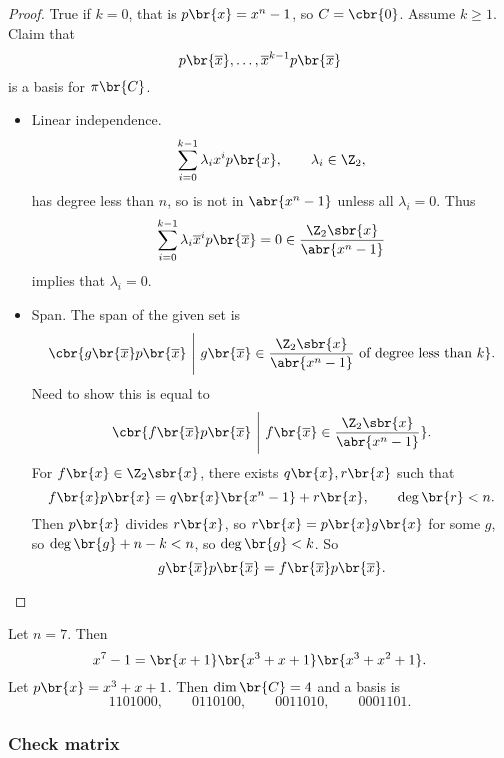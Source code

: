 \begin{proof}
True if $ k = 0 $, that is $ p\br{x} = x^n - 1 $, so $ C = \cbr{0} $. Assume $ k \ge 1 $. Claim that
$$ p\br{\overline{x}}, \dots, \overline{x}^{k - 1}p\br{\overline{x}} $$
is a basis for $ \pi\br{C} $.
\begin{itemize}
\item Linear independence.
$$ \sum_{i = 0}^{k - 1} \lambda_ix^ip\br{x}, \qquad \lambda_i \in \Z_2, $$
has degree less than $ n $, so is not in $ \abr{x^n - 1} $ unless all $ \lambda_i = 0 $. Thus
$$ \sum_{i = 0}^{k - 1} \lambda_i\overline{x}^ip\br{\overline{x}} = 0 \in \dfrac{\Z_2\sbr{x}}{\abr{x^n - 1}} $$
implies that $ \lambda_i = 0 $.

\pagebreak

\item Span. The span of the given set is
$$ \cbr{g\br{\overline{x}}p\br{\overline{x}} \ \Bigg| \ g\br{\overline{x}} \in \dfrac{\Z_2\sbr{x}}{\abr{x^n - 1}} \ \text{of degree less than} \ k}. $$
Need to show this is equal to
$$ \cbr{f\br{\overline{x}}p\br{\overline{x}} \ \Bigg| \ f\br{\overline{x}} \in \dfrac{\Z_2\sbr{x}}{\abr{x^n - 1}}}. $$
For $ f\br{x} \in \Z_2\sbr{x} $, there exists $ q\br{x}, r\br{x} $ such that
$$ f\br{x}p\br{x} = q\br{x}\br{x^n - 1} + r\br{x}, \qquad \deg\br{r} < n. $$
Then $ p\br{x} $ divides $ r\br{x} $, so $ r\br{x} = p\br{x}g\br{x} $ for some $ g $, so $ \deg\br{g} + n - k < n $, so $ \deg\br{g} < k $. So
$$ g\br{\overline{x}}p\br{\overline{x}} = f\br{\overline{x}}p\br{\overline{x}}. $$
\end{itemize}
\end{proof}

\begin{example*}
Let $ n = 7 $. Then
$$ x^7 - 1 = \br{x + 1}\br{x^3 + x + 1}\br{x^3 + x^2 + 1}. $$
Let $ p\br{x} = x^3 + x + 1 $. Then $ \dim\br{C} = 4 $ and a basis is
$$ 1101000, \qquad 0110100, \qquad 0011010, \qquad 0001101. $$
\end{example*}

\subsubsection{Check matrix}

